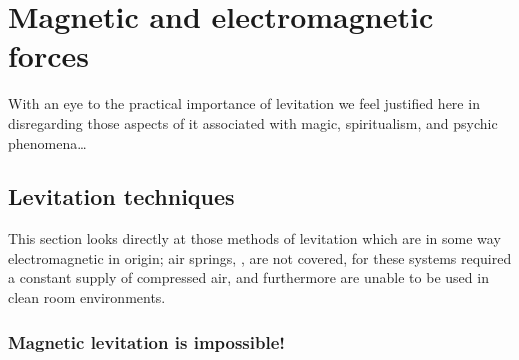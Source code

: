 \chapter{Magnetic and electromagnetic forces}

\epigraph{With an eye to the practical importance of levitation we
feel justified here in disregarding those aspects of it
associated with magic, spiritualism, and psychic
phenomena\dots}{\textcite{boerdijk1956b}}



\section{Levitation techniques}

This section looks directly at those methods of levitation which
are in some way electromagnetic in origin; air springs, \eg, are
not covered, for these systems required a constant supply of
compressed air, and furthermore are unable to be used in clean
room environments.

\subsection{Magnetic levitation is impossible!}

